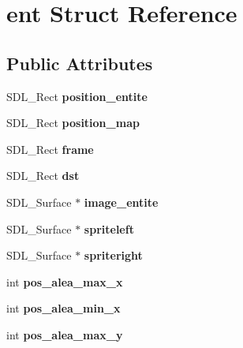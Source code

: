 \hypertarget{structent}{}\section{ent Struct Reference}
\label{structent}
\subsection*{Public Attributes}
\begin{DoxyCompactItemize}
\item 
\mbox{\label{structent_a6a1d1ef8616b14a98ae9532cfb8c33e9}} 
S\+D\+L\+\_\+\+Rect {\bfseries position\+\_\+entite}
\item 
\mbox{\label{structent_afea8f34bcada346f59d98f2fa13c64b8}} 
S\+D\+L\+\_\+\+Rect {\bfseries position\+\_\+map}
\item 
\mbox{\label{structent_a5bf4e30b987726ecd55f0a0e25cd1471}} 
S\+D\+L\+\_\+\+Rect {\bfseries frame}
\item 
\mbox{\label{structent_af824974d0d70a512f326c71208aa4474}} 
S\+D\+L\+\_\+\+Rect {\bfseries dst}
\item 
\mbox{\label{structent_ada71906c5deb56a359f4a1c87a806e71}} 
S\+D\+L\+\_\+\+Surface $\ast$ {\bfseries image\+\_\+entite}
\item 
\mbox{\label{structent_a7d33febca51de6fcf732a69aaf3b7fed}} 
S\+D\+L\+\_\+\+Surface $\ast$ {\bfseries spriteleft}
\item 
\mbox{\label{structent_a8e2ca44dcbfe4e2f948a2b45cfa3724f}} 
S\+D\+L\+\_\+\+Surface $\ast$ {\bfseries spriteright}
\item 
\mbox{\label{structent_a78fb82b5fdb55f6d4a3f432049709419}} 
int {\bfseries pos\+\_\+alea\+\_\+max\+\_\+x}
\item 
\mbox{\label{structent_a8d7999125392ec219b66bc78f2a41e14}} 
int {\bfseries pos\+\_\+alea\+\_\+min\+\_\+x}
\item 
\mbox{\label{structent_ac0017841b85c5c162dbf49b69c2af772}} 
int {\bfseries pos\+\_\+alea\+\_\+max\+\_\+y}

\end{DoxyCompactItemize}
